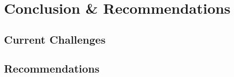 \section{Conclusion \& Recommendations}

\subsection{Current Challenges}

\subsection{Recommendations}